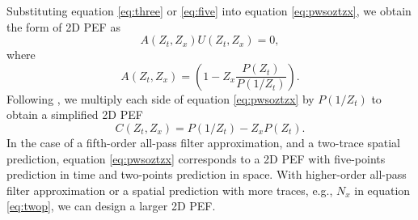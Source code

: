 Substituting equation \ref{eq:three} or \ref{eq:five} into equation \ref{eq:pwsoztzx}, we obtain the form of 2D PEF as
\begin{equation}
\label{eq:pwsoztzx2}
A(Z_t,Z_x) U(Z_t,Z_x) = 0,
\end{equation}
where
\begin{equation}
\label{eq:pwsoztzx3}
A(Z_t,Z_x)= (1-Z_x\frac{P(Z_t)}{P(1/Z_t)}).
\end{equation}
Following \cite{fomel2002pwd}, we multiply each side of equation \ref{eq:pwsoztzx} by $P(1/Z_t)$ to obtain a simplified 2D PEF
\begin{equation}
\label{eq:pwsoztzx4}
C(Z_t,Z_x) = P(1/Z_t)-Z_xP(Z_t).
\end{equation}
In the case of a fifth-order all-pass filter approximation, and a two-trace spatial prediction, equation \ref{eq:pwsoztzx} corresponds to a 2D PEF with five-points prediction in time and two-points prediction in space. With higher-order all-pass filter approximation or a spatial prediction with more traces, e.g., $N_x$ in equation \ref{eq:twop}, we can design a larger 2D PEF. 

